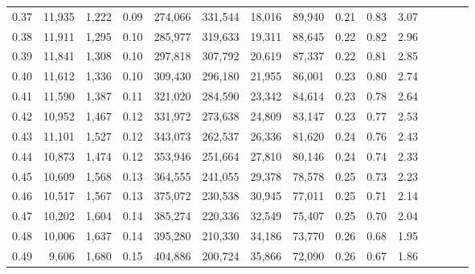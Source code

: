 \begin{tabular}{rrrcrrrrrrrrrrr}
0.37 &  11,935 &  1,222 &                                       0.09 &  274,066 &  331,544 &   18,016 &   89,940 &  0.21 &  0.83 &                         3.07 \\
0.38 &  11,911 &  1,295 &                                       0.10 &  285,977 &  319,633 &   19,311 &   88,645 &  0.22 &  0.82 &                         2.96 \\
0.39 &  11,841 &  1,308 &                                       0.10 &  297,818 &  307,792 &   20,619 &   87,337 &  0.22 &  0.81 &                         2.85 \\
0.40 &  11,612 &  1,336 &                                       0.10 &  309,430 &  296,180 &   21,955 &   86,001 &  0.23 &  0.80 &                         2.74 \\
0.41 &  11,590 &  1,387 &                                       0.11 &  321,020 &  284,590 &   23,342 &   84,614 &  0.23 &  0.78 &                         2.64 \\
0.42 &  10,952 &  1,467 &                                       0.12 &  331,972 &  273,638 &   24,809 &   83,147 &  0.23 &  0.77 &                         2.53 \\
0.43 &  11,101 &  1,527 &                                       0.12 &  343,073 &  262,537 &   26,336 &   81,620 &  0.24 &  0.76 &                         2.43 \\
0.44 &  10,873 &  1,474 &                                       0.12 &  353,946 &  251,664 &   27,810 &   80,146 &  0.24 &  0.74 &                         2.33 \\
0.45 &  10,609 &  1,568 &                                       0.13 &  364,555 &  241,055 &   29,378 &   78,578 &  0.25 &  0.73 &                         2.23 \\
0.46 &  10,517 &  1,567 &                                       0.13 &  375,072 &  230,538 &   30,945 &   77,011 &  0.25 &  0.71 &                         2.14 \\
0.47 &  10,202 &  1,604 &                                       0.14 &  385,274 &  220,336 &   32,549 &   75,407 &  0.25 &  0.70 &                         2.04 \\
0.48 &  10,006 &  1,637 &                                       0.14 &  395,280 &  210,330 &   34,186 &   73,770 &  0.26 &  0.68 &                         1.95 \\
0.49 &   9,606 &  1,680 &                                       0.15 &  404,886 &  200,724 &   35,866 &   72,090 &  0.26 &  0.67 &                         1.86 \\

\end{tabular}
